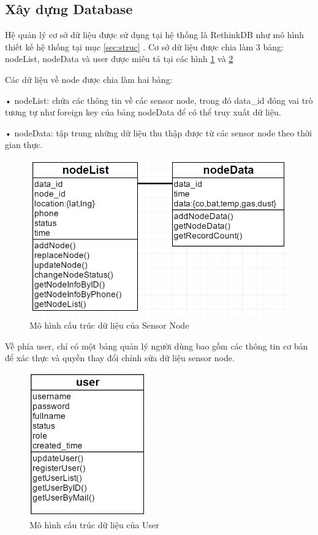 


\subsection{Xây dựng Database}
Hệ quản lý cơ sở dữ liệu được sử dụng tại hệ thống là RethinkDB như mô hình thiết kế hệ thống tại mục \ref{sec:struc} . Cơ sở dữ liệu được chia làm 3 bảng: nodeList, nodeData và user được miêu tả tại các hình \ref{fig: dbnode} và \ref{fig: dbuser}

Các dữ liệu về node được chia làm hai bảng:

• nodeList: chứa các thông tin về các sensor node, trong đó data\_id đóng vai trò tương tự như foreign key của bảng nodeData để có thể truy xuất dữ liệu.

• nodeData: tập trung những dữ liệu thu thập được từ các sensor node theo thời gian thực. 
\begin{figure}[H]
	\centering    
	\includegraphics[width=1.0\textwidth]{dbnode}
	\caption[Mô hình cấu trúc dữ liệu của Sensor Node]{Mô hình cấu trúc dữ liệu của Sensor Node}
	\label{fig: dbnode}
\end{figure}
Về phía user, chỉ có một bảng quản lý người dùng bao gồm các thông tin cơ bản để xác thực và quyền thay đổi chỉnh sửa dữ liệu sensor node.
\begin{figure}[H]
	\centering    
	\includegraphics[width=0.45\textwidth]{dbuser}
	\caption[Mô hình cấu trúc dữ liệu của User]{Mô hình cấu trúc dữ liệu của User}
	\label{fig: dbuser}
\end{figure}

